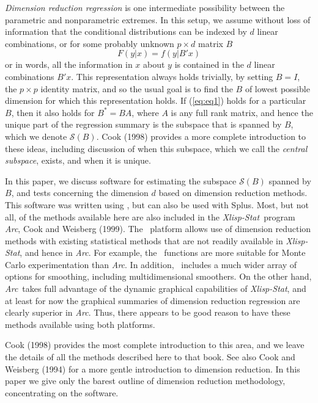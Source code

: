 \documentclass{article}
\newcommand{\Splus}{{\normalfont\textsf{Splus}}{}}
\newcommand{\arc}{{\em Arc}}
\newcommand{\xls}{{\em Xlisp-Stat}}
\renewcommand{\span}{{\mathcal S}}
\begin{document}
{\em Dimension reduction regression} is one intermediate
possibility between the parametric and nonparametric extremes.  In
this setup, we assume without loss of information that the
conditional distributions can be indexed by $d$ linear
combinations, or for some probably unknown $p\times d$ matrix $B$
\begin{equation}
F(y|x) = f(y|B'x)
\label{eq:eq1}
\end{equation}
or in words, all the information in $x$ about $y$ is contained in
the $d$ linear combinations $B'x$.
This representation always holds trivially, by setting $B=I$, the
$p\times p$ identity matrix, and so the usual goal is to find the
$B$ of lowest possible dimension for which this representation
holds.  If (\ref{eq:eq1}) holds for a particular $B$, then it also
holds for $B^*=BA$, where $A$ is any full rank matrix, and hence
the unique part of the regression summary is the subspace that is
spanned by $B$, which we denote $\span(B)$. Cook (1998) provides a
more complete introduction to these ideas, including discussion of
when this subspace, which we call the {\em central subspace},
exists, and when it is unique.

In this paper, we discuss software for estimating the subspace
$\span(B)$ spanned by $B$, and tests concerning the dimension $d$
based on dimension reduction methods. This software was written
using \R, but can also be used with
\Splus.  Most, but not all, of the methods available here are also
included in the
\xls\ program
\arc, Cook and
Weisberg (1999).  The \R\ platform allows use of dimension reduction
methods with existing statistical methods that are not readily available in
\xls, and hence in \arc.  For example, the \R\ functions are more suitable for
Monte Carlo experimentation than \arc.  In addition, \R\ includes a much wider
array of options for smoothing, including multidimensional smoothers.
On the other hand,
\arc\ takes full advantage of the dynamic graphical capabilities of \xls, and at
least for now the graphical summaries of dimension reduction regression are
clearly superior in \arc.  Thus, there appears to be good reason to have
these methods available using both platforms.

Cook (1998) provides the most complete introduction to this area, and we
leave the details of all the methods described here to that book.
See also Cook and Weisberg (1994) for a more gentle introduction
to dimension reduction. In this paper we give only the barest
outline of dimension reduction methodology, concentrating on the
software.
\end{document}
